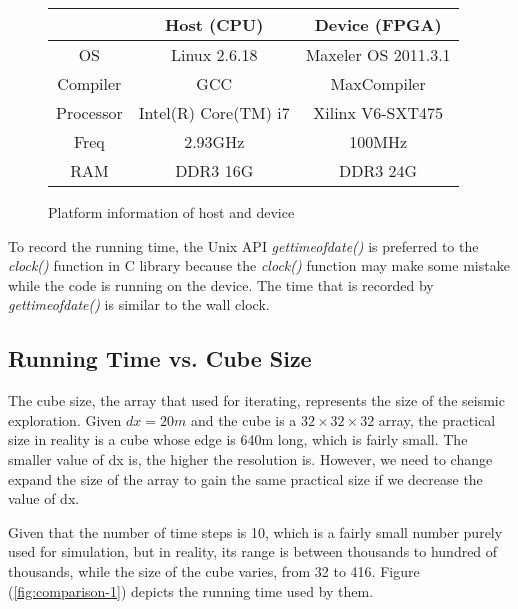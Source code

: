 \begin{figure}
\begin{centering}
\begin{tabular}{|c|c|c|}
\hline
 & Host (CPU) & Device (FPGA)\tabularnewline
\hline
\hline
OS & Linux 2.6.18 & Maxeler OS 2011.3.1\tabularnewline
\hline
Compiler & GCC & MaxCompiler\tabularnewline
\hline
Processor & Intel(R) Core(TM) i7 & Xilinx V6-SXT475\tabularnewline
\hline
Freq & 2.93GHz & 100MHz\tabularnewline
\hline
RAM & DDR3 16G & DDR3 24G\tabularnewline
\hline
\end{tabular}
\par\end{centering}

\caption{\label{fig:Platform-information-of}Platform information of host and
device}


\end{figure}

To record the running time, the Unix API \emph{gettimeofdate()} is preferred 
to the \emph{clock()} function in C library because the 
\emph{clock()} function may make some mistake while the code is running on 
the device. The time that is recorded by \emph{gettimeofdate()} is similar 
to the wall clock.

\label{ssub:Platform information}


\subsection{Running Time vs. Cube Size}


The cube size, the array that used for iterating, represents the size
of the seismic exploration. Given \ensuremath{dx=20m}
 and the cube is a \ensuremath{32\times32\times32}
 array, the practical size in reality is a cube whose edge is 640m
long, which is fairly small. The smaller value of dx is, the higher
the resolution is. However, we need to change expand the size of the
array to gain the same practical size if we decrease the value of
dx.

Given that the number of time steps is 10, which is a fairly small number 
purely used for simulation, but in reality, its range is between thousands 
to hundred of thousands, while the size of the cube varies, from 32 to 416. 
Figure (\ref{fig:comparison-1}) depicts the running time used by them.

\label{sub:Running Time vs. Cube Si}



